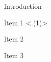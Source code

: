 \documentclass[pdf]{beamer}
\begin{document}
\begin{frame}{Introduction}
    \begin{itemize}
        \item Item 1
        \pause
        \uncover<.(1)>{\item Item 2}
        \pause
        \item Item 3
    \end{itemize}
\end{frame}
\end{document}
